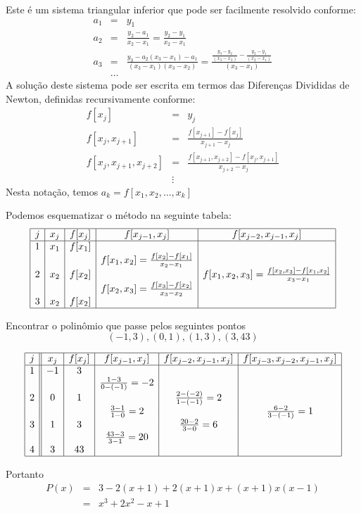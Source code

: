 Este é um sistema triangular inferior que pode ser facilmente resolvido conforme:
\begin{eqnarray*}
a_1&=&y_1\\
a_2&=&\frac{y_2-a_1}{x_2-x_1}=\frac{y_2-y_1}{x_2-x_1}\\
a_3&=&\frac{y_3-a_2(x_3-x_1)-a_1}{(x_3-x_1)(x_3-x_2)}=\frac{\frac{y_3-y_2}{(x_3-x_2)}-\frac{y_2-y_1}{(x_2-x_1)}}{(x_3-x_1)}\\
&\ldots&
\end{eqnarray*}
A solução deste sistema pode ser escrita em termos das Diferenças Divididas de Newton, definidas recursivamente conforme:
\begin{eqnarray*}
f[x_j]&=&y_j\\
f[x_j,x_{j+1}]&=&\frac{f[x_{j+1}]-f[x_j]}{x_{j+1}-x_j}\\
f[x_j,x_{j+1},x_{j+2}]&=&\frac{f[x_{j+1},x_{j+2}]-f[x_j,x_{j+1}]}{x_{j+2}-x_j}\\
&\vdots&
\end{eqnarray*}
Nesta notação, temos
$a_k=f[x_1,x_2,\ldots,x_k]$

Podemos esquematizar o método na seguinte tabela:
$$
\begin{array}{|c|c|c|c|c|}\hline
j &x_j&f[x_j]&f[x_{j-1},x_j]&f[x_{j-2},x_{j-1},x_j]\\\hline
1 & x_1 & f[x_1]&&\\
&&&f[x_1,x_2]=\frac{f[x_2]-f[x_1]}{x_2-x_1}&\\
2 & x_2&f[x_2]&&f[x_1,x_2,x_3]=\frac{f[x_2,x_3]-f[x_1,x_2]}{x_3-x_1}\\
&&&f[x_2,x_3]=\frac{f[x_3]-f[x_2]}{x_3-x_2}&\\
3 & x_2&f[x_2]&&\\\hline
\end{array}
$$

\begin{ex}
Encontrar o polinômio que passe pelos seguintes pontos
$$(-1,3),(0,1),(1,3),(3,43)$$

\begin{equation*}
\begin{array}{|c||c|c|c|c|c|}\hline
 j&x_j&f[x_j]&f[x_{j-1},x_j]&f[x_{j-2},x_{j-1},x_j]&f[x_{j-3},x_{j-2},x_{j-1},x_j]\\\hline
1& -1 & 3&&&\\
&&&\frac{1-3}{0-(-1)}=-2&&\\
2&0&1&&\frac{2-(-2)}{1-(-1)}=2&\\
&&&\frac{3-1}{1-0}=2&&\frac{6-2}{3-(-1)}=1\\
3&1&3&&\frac{20-2}{3-0}=6&\\
&&&\frac{43-3}{3-1}=20&&\\
4&3&43&&&\\\hline
\end{array}  
\end{equation*}



Portanto
\begin{eqnarray*}
P(x)&=&3-2(x+1)+2(x+1)x+(x+1)x(x-1)\\
&=&x^3+2x^2-x+1
\end{eqnarray*}
\end{ex}

